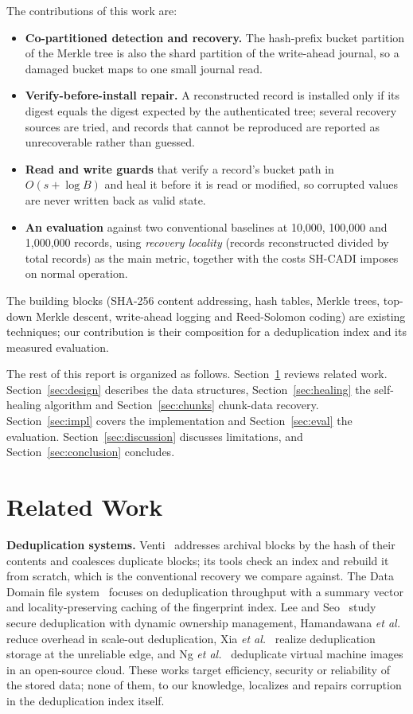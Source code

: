 \documentclass[conference]{IEEEtran}
\begin{document}
The contributions of this work are:
\begin{itemize}
\item \textbf{Co-partitioned detection and recovery.} The hash-prefix bucket partition of the Merkle tree is also the shard partition of the write-ahead journal, so a damaged bucket maps to one small journal read.
\item \textbf{Verify-before-install repair.} A reconstructed record is installed only if its digest equals the digest expected by the authenticated tree; several recovery sources are tried, and records that cannot be reproduced are reported as unrecoverable rather than guessed.
\item \textbf{Read and write guards} that verify a record's bucket path in $O(s+\log B)$ and heal it before it is read or modified, so corrupted values are never written back as valid state.
\item \textbf{An evaluation} against two conventional baselines at 10,000, 100,000 and 1,000,000 records, using \emph{recovery locality} (records reconstructed divided by total records) as the main metric, together with the costs SH-CADI imposes on normal operation.
\end{itemize}

The building blocks (SHA-256 content addressing, hash tables, Merkle trees, top-down Merkle descent, write-ahead logging and Reed-Solomon coding) are existing techniques; our contribution is their composition for a deduplication index and its measured evaluation.

The rest of this report is organized as follows. Section~\ref{sec:related} reviews related work. Section~\ref{sec:design} describes the data structures, Section~\ref{sec:healing} the self-healing algorithm and Section~\ref{sec:chunks} chunk-data recovery. Section~\ref{sec:impl} covers the implementation and Section~\ref{sec:eval} the evaluation. Section~\ref{sec:discussion} discusses limitations, and Section~\ref{sec:conclusion} concludes.

\section{Related Work}
\label{sec:related}

\textbf{Deduplication systems.} Venti~\cite{venti} addresses archival blocks by the hash of their contents and coalesces duplicate blocks; its tools check an index and rebuild it from scratch, which is the conventional recovery we compare against. The Data Domain file system~\cite{datadomain} focuses on deduplication throughput with a summary vector and locality-preserving caching of the fingerprint index. Lee and Seo~\cite{leeseo} study secure deduplication with dynamic ownership management, Hamandawana \emph{et al.}~\cite{speeddedup} reduce overhead in scale-out deduplication, Xia \emph{et al.}~\cite{mean} realize deduplication storage at the unreliable edge, and Ng \emph{et al.}~\cite{livededup} deduplicate virtual machine images in an open-source cloud. These works target efficiency, security or reliability of the stored data; none of them, to our knowledge, localizes and repairs corruption in the deduplication index itself.
\end{document}
